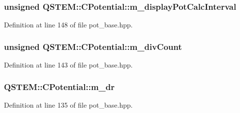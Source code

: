 \hypertarget{class_q_s_t_e_m_1_1_c_potential_a17a7497eae902962a89a5a69f052d738}{
\subsubsection[{m\-\_\-display\-Pot\-Calc\-Interval}]{\setlength{\rightskip}{0pt plus 5cm}unsigned Q\-S\-T\-E\-M\-::\-C\-Potential\-::m\-\_\-display\-Pot\-Calc\-Interval\hspace{0.3cm}{\ttfamily [protected]}}}\label{class_q_s_t_e_m_1_1_c_potential_a17a7497eae902962a89a5a69f052d738}


Definition at line 148 of file pot\-\_\-base.\-hpp.

\hypertarget{class_q_s_t_e_m_1_1_c_potential_a39190bdd6d4704761a8406fcfb0e2586}{
\subsubsection[{m\-\_\-div\-Count}]{\setlength{\rightskip}{0pt plus 5cm}unsigned Q\-S\-T\-E\-M\-::\-C\-Potential\-::m\-\_\-div\-Count\hspace{0.3cm}{\ttfamily [protected]}}}\label{class_q_s_t_e_m_1_1_c_potential_a39190bdd6d4704761a8406fcfb0e2586}


Definition at line 143 of file pot\-\_\-base.\-hpp.

\hypertarget{class_q_s_t_e_m_1_1_c_potential_aa2e21e93059f4ba4705020defff2d42d}{
\subsubsection[{m\-\_\-dr}]{ Q\-S\-T\-E\-M\-::\-C\-Potential\-::m\-\_\-dr\hspace{0.3cm}{\ttfamily [protected]}}}\label{class_q_s_t_e_m_1_1_c_potential_aa2e21e93059f4ba4705020defff2d42d}


Definition at line 135 of file pot\-\_\-base.\-hpp.

